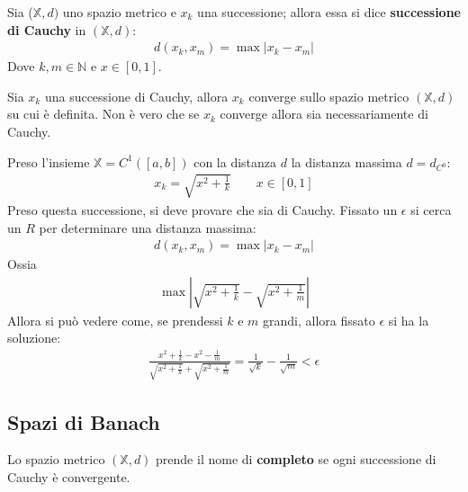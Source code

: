\documentclass[a4paper, oneside]{book}
\begin{document}
\begin{definition}
    Sia ($\mathbb{X}, d)$ uno spazio metrico e $x_k$ una successione; allora
    essa si dice \textbf{successione di Cauchy} in $(\mathbb{X}, d)$:
    \begin{gather*}
        d(x_k, x_m) = \max \left|  x_k - x_m \right| 
    \end{gather*}
    Dove $k, m \in \mathbb{N}$ e $x \in [0, 1]$. 
\end{definition}
\begin{observation}
    Sia $x_k$ una successione di Cauchy, allora $x_k$ converge
    sullo spazio metrico $(\mathbb{X}, d)$ su cui è definita. Non
    è vero che se $x_k$ converge allora sia necessariamente di Cauchy.
\end{observation}
\begin{example}
    Preso l'insieme $\mathbb{X} = C^{1}([a, b]) $ con la distanza $d$ la distanza
    massima $d = d_{C^{0}}$:
    \begin{gather*}
        x_k = \sqrt{x^{2} + \frac{1}{k} } \qquad x \in [0, 1]
    \end{gather*} 
    Preso questa successione, si deve provare che sia di Cauchy. Fissato un $\epsilon$ si cerca
    un $R$ per determinare una distanza massima:
    \begin{gather*}
        d(x_k, x_m) = \max  |x_k - x_m| 
    \end{gather*}
    Ossia
    \begin{gather*}
        \max \left| \sqrt{x^{2} + \frac{1}{k} } - \sqrt{x^{2} + \frac{1}{m} }  \right| 
    \end{gather*}
    Allora si può vedere come, se prendessi $k$ e $m$ grandi, allora fissato $\epsilon$ si ha la soluzione:
    \begin{gather*}
        \frac{x^{2}+ \frac{1}{k} - x^{2} - \frac{1}{m}  }{\sqrt{x^{2} + \frac{1}{k} } + \sqrt{x^{2} + \frac{1}{m} }  } = \frac{1}{\sqrt{k} } - \frac{1}{\sqrt{m} } < \epsilon
    \end{gather*}
\end{example}

\subsection{Spazi di Banach}

\begin{definition}
    Lo spazio metrico $(\mathbb{X}, d)$ prende il nome di \textbf{completo} se ogni
    successione di Cauchy è convergente.
\end{definition}
\end{document}
